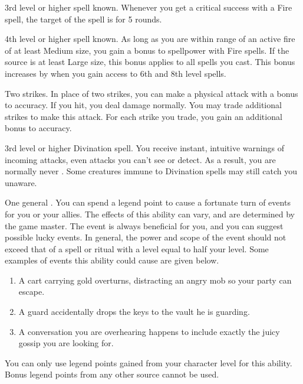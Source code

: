\featpre 3rd level or higher  spell known.
\featben Whenever you get a critical success with a Fire spell, the target of the spell is \ignited for 5 rounds.

\featpre 4th level or higher  spell known.
\featben As long as you are within \rngmed range of an active fire of at least Medium size, you gain a  bonus to spellpower with Fire spells.
If the source is at least Large size, this bonus applies to all spells you cast.
This bonus increases by  when you gain access to 6th and 8th level spells.

\featpre Two strikes.
\featben In place of two strikes, you can make a physical attack with a  bonus to accuracy.
If you hit, you deal damage normally.
You may trade additional strikes to make this attack.
For each strike you trade, you gain an additional  bonus to accuracy.

\featpre 3rd level or higher Divination spell.
\featben You receive instant, intuitive warnings of incoming attacks, even attacks you can't see or detect.
As a result, you are normally never \unaware.
Some creatures immune to Divination spells may still catch you unaware.

\featpre One general .
\featben You can spend a legend point to cause a fortunate turn of events for you or your allies.
The effects of this ability can vary, and are determined by the game master.
The event is always beneficial for you, and you can suggest possible lucky events.
In general, the power and scope of the event should not exceed that of a spell or ritual with a level equal to half your level.
Some examples of events this ability could cause are given below.
\begin{enumerate}
    \item A cart carrying gold overturns, distracting an angry mob so your party can escape.
    \item A guard accidentally drops the keys to the vault he is guarding.
    \item A conversation you are overhearing happens to include exactly the juicy gossip you are looking for.
\end{enumerate}

You can only use legend points gained from your character level for this ability.
Bonus legend points from any other source cannot be used.

